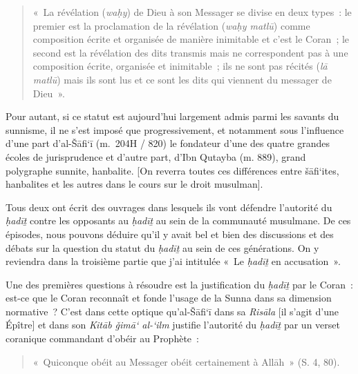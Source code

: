 \begin{quote}
«~La révélation (\emph{waḥy}) de Dieu à son Messager se divise en deux
types~: le premier est la proclamation de la révélation (\emph{waḥy
matlū}) comme composition écrite et organisée de manière inimitable et
c'est le Coran~; le second est la révélation des dits transmis mais ne
correspondent pas à une composition écrite, organisée et inimitable~;
ils ne sont pas récités (\emph{lā matlū}) mais ils sont lus et ce sont
les dits qui viennent du messager de Dieu~».
\end{quote}




 

Pour autant, si ce statut est aujourd'hui largement admis parmi les
savants du sunnisme, il ne s'est imposé que progressivement, et
notamment sous l'influence d'une part d'al-Šāfi`ī (m.~204H / 820) le
fondateur d'une des quatre grandes écoles de jurisprudence et d'autre
part, d'Ibn Qutayba (m. 889), grand polygraphe sunnite, hanbalite. {[}On
reverra toutes ces différences entre šāfi`ites, hanbalites et les autres
dans le cours sur le droit musulman{]}.

Tous deux ont écrit des ouvrages dans lesquels ils vont défendre
l'autorité du \emph{ḥadīṯ} contre les opposants au \emph{ḥadīṯ} au sein
de la communauté musulmane. De ces épisodes, nous pouvons déduire qu'il
y avait bel et bien des discussions et des débats sur la question du
statut du \emph{ḥadīṯ} au sein de ces générations. On y reviendra dans
la troisième partie que j'ai intitulée «~Le \emph{ḥadīṯ} en
accusation~».

Une des premières questions à résoudre est la justification du
\emph{ḥadīṯ} par le Coran~: est-ce que le Coran reconnaît et fonde
l'usage de la Sunna dans sa dimension normative~? C'est dans cette
optique qu'al-Šāfi`ī dans sa \emph{Risāla} {[}il s'agit d'une Épître{]}
et dans son \emph{Kitāb ǧimā` al-`ilm} justifie l'autorité du
\emph{ḥadīṯ} par un verset coranique commandant d'obéir au Prophète~:
\begin{quote}
    «~Quiconque obéit au Messager obéit certainement à Allāh~» (S. 4, 80).


\end{quote}

